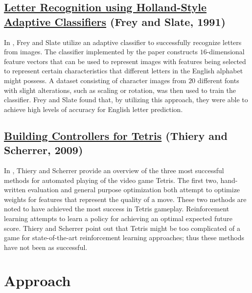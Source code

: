 \documentclass[10pt, final]{article}
\begin{document}
\subsection{\href{https://http://cns-classes.bu.edu/cn550/Readings/frey-slate-91.pdf}{Letter Recognition using Holland-Style Adaptive Classifiers} (Frey and Slate, 1991)}
In \cite{1}, Frey and Slate utilize an adaptive classifier to successfully recognize letters from images. The classifier implemented by the paper constructs $16$-dimensional feature vectors that can be used to represent images with features being selected to represent certain characteristics that different letters in the English alphabet might possess. A dataset consisting of character images from $20$ different fonts with slight alterations, such as scaling or rotation, was then used to train the classifier. Frey and Slate found that, by utilizing this approach, they were able to achieve high levels of accuracy for English letter prediction.

\subsection{\href{https://hal.inria.fr/inria-00418954/document}{Building Controllers for Tetris} (Thiery and Scherrer, 2009)}
In \cite{2}, Thiery and Scherrer provide an overview of the three most successful methods for automated playing of the video game Tetris. The first two, hand-written evaluation and general purpose optimization both attempt to optimize weights for features that represent the quality of a move. These two methods are noted to have achieved the most success in Tetris gameplay. Reinforcement learning attempts to learn a policy for achieving an optimal expected future score. Thiery and Scherrer point out that Tetris might be too complicated of a game for state-of-the-art reinforcement learning approaches; thus these methods have not been as successful.

\section{Approach}
\end{document}
